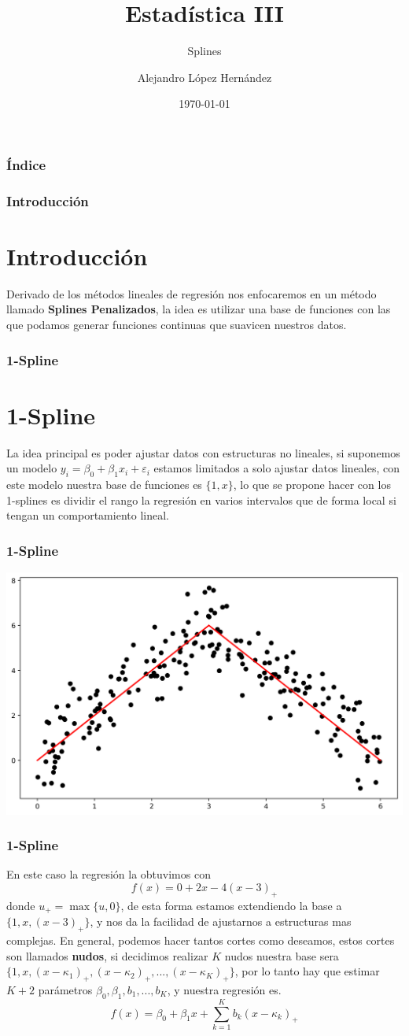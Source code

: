 \documentclass[aspectratio=169,spanish]{beamer}
\title{Estadística III}
\subtitle{Splines}
\author{Alejandro López Hernández}
\institute{FES Acatlán - UNAM}
\date{\today}
\begin{document}
\frame{\titlepage}

\begin{frame}
\frametitle{Índice}
\tableofcontents
\end{frame}

\begin{frame}
\frametitle{Introducción}
\section{Introducción}
Derivado de los métodos lineales de regresión nos enfocaremos en un método llamado \textbf{Splines Penalizados}, la idea es utilizar una base de funciones con las que podamos generar funciones continuas que suavicen nuestros datos. 
\end{frame}

\begin{frame}
\frametitle{1-Spline}
\section{1-Spline}
La idea principal es poder ajustar datos con estructuras no lineales, si suponemos un modelo $y_i=\beta_0+\beta_1x_i+\varepsilon_i$ estamos limitados a solo ajustar datos lineales, con este modelo nuestra base de funciones es $\{1,x\}$, lo que se propone hacer con los 1-splines es dividir el rango la regresión en varios intervalos que de forma local si tengan un comportamiento lineal. 
\end{frame}


\begin{frame}
\frametitle{1-Spline}
\center
\includegraphics[scale=0.5]{spline1}
\end{frame}


\begin{frame}
\frametitle{1-Spline}
En este caso la regresión la obtuvimos con $$f(x) = 0 + 2x - 4 (x-3)_{+}$$
donde $u_{+}=\max\{u,0\}$, de esta forma estamos extendiendo la base a $\{1,x,(x-3)_{+}\}$, y nos da la facilidad de ajustarnos a estructuras mas complejas. 
En general, podemos hacer tantos cortes como deseamos, estos cortes son llamados \textbf{nudos}, si decidimos realizar $K$ nudos nuestra base sera $\{1,x,(x-\kappa_1)_{+},(x-\kappa_2)_{+},...,(x-\kappa_K)_{+}\}$, por lo tanto hay que estimar $K+2$ parámetros $\beta_0,\beta_1,b_1,...,b_{K}$, y nuestra regresión es. $$ f(x) = \beta_0+\beta_1 x + \sum_{k=1}^{K}b_k (x-\kappa_k)_{+}$$
\end{frame}
\end{document}
